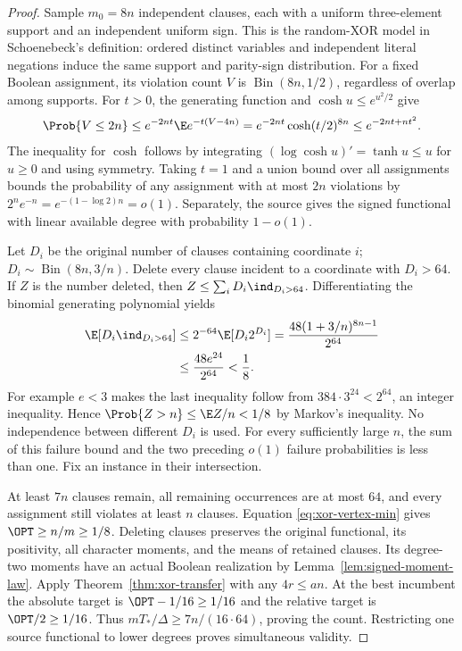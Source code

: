 \begin{proof}
Sample $m_0=8n$ independent clauses, each with a uniform three-element
support and an independent uniform sign. This is the random-XOR model in
Schoenebeck's definition: ordered distinct variables and independent literal
negations induce the same support and parity-sign distribution.
For a fixed Boolean assignment, its violation count $V$ is
$\operatorname{Bin}(8n,1/2)$, regardless of overlap among supports. For
$t>0$, the generating function and $\cosh u\le e^{u^2/2}$ give
\[
 \Prob\{V\le2n\}
 \le e^{-2nt}\E e^{-t(V-4n)}
 =e^{-2nt}\cosh(t/2)^{8n}
 \le e^{-2nt+nt^2}.
\]
The inequality for $\cosh$ follows by integrating
$(\log\cosh u)'=\tanh u\le u$ for $u\ge0$ and using symmetry.
Taking $t=1$ and a union bound over all assignments bounds the probability
of any assignment with at most $2n$ violations by
$2^ne^{-n}=e^{-(1-\log2)n}=o(1)$. Separately, the source gives the signed
functional with linear available degree with probability $1-o(1)$.

Let $D_i$ be the original number of clauses containing coordinate $i$;
$D_i\sim\operatorname{Bin}(8n,3/n)$. Delete every clause incident to a
coordinate with $D_i>64$. If $Z$ is the number deleted, then
$Z\le\sum_iD_i\ind_{D_i>64}$. Differentiating the binomial generating
polynomial yields
\begin{align}
 \E[D_i\ind_{D_i>64}]
 &\le2^{-64}\E[D_i2^{D_i}]
   =\frac{48(1+3/n)^{8n-1}}{2^{64}}\nonumber\\
 &\le\frac{48e^{24}}{2^{64}}<\frac18.
 \label{eq:xor-deletion}
\end{align}
For example $e<3$ makes the last inequality follow from
$384\cdot3^{24}<2^{64}$, an integer inequality. Hence
$\Prob\{Z>n\}\le\E Z/n<1/8$ by Markov's inequality.
No independence between different $D_i$ is used. For every sufficiently
large $n$, the sum of this failure bound and the two preceding $o(1)$
failure probabilities is less than one. Fix an instance in their
intersection.

At least $7n$ clauses remain, all remaining occurrences are at most $64$,
and every assignment still violates at least $n$ clauses. Equation
\eqref{eq:xor-vertex-min} gives $\OPT\ge n/m\ge1/8$.
Deleting clauses preserves the original functional, its positivity, all
character moments, and the means of retained clauses. Its degree-two
moments have an actual Boolean realization by
Lemma~\ref{lem:signed-moment-law}. Apply Theorem~\ref{thm:xor-transfer}
with any $4r\le an$. At the best incumbent the absolute target is
$\OPT-1/16\ge1/16$ and the relative target is $\OPT/2\ge1/16$.
Thus $mT_*/\Delta\ge7n/(16\cdot64)$, proving the count. Restricting
one source functional to lower degrees proves simultaneous validity.
\end{proof}

